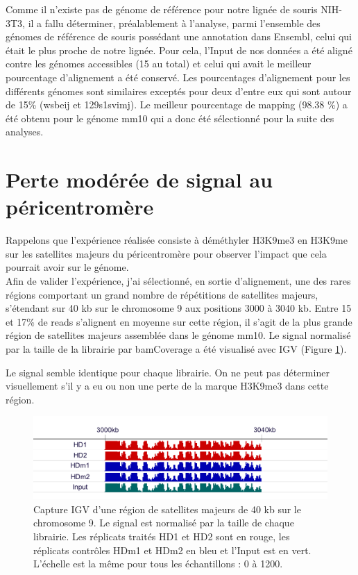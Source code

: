 \documentclass[a4paper,12pt,times]{report}
\newcommand{\scaption}[1]{\caption{\footnotesize{#1}}}
\begin{document}
    Comme il n’existe pas de  génome de référence pour notre lignée de souris NIH-3T3, il a fallu déterminer, préalablement à l'analyse, parmi l’ensemble des génomes de référence de souris possédant une annotation dans Ensembl, celui qui était le plus proche de notre lignée. 
    Pour cela, l’Input de nos données a été aligné contre les génomes accessibles (15 au total) et celui qui avait le meilleur pourcentage d’alignement a été conservé. 
    Les pourcentages d'alignement pour les différents génomes sont similaires exceptés pour deux d'entre eux qui sont autour de 15\% (wsbeij et 129s1svimj).
    \newline Le meilleur pourcentage de mapping (98.38 \%) a été obtenu pour le génome mm10 qui a donc été sélectionné pour la suite des analyses.

    \section{Perte modérée de signal au péricentromère}
    Rappelons que l'expérience réalisée consiste à déméthyler H3K9me3 en H3K9me sur les satellites majeurs du péricentromère pour observer l'impact que cela pourrait avoir sur le génome. \\
    Afin de valider l'expérience, j'ai sélectionné, en sortie d'alignement, une des rares régions comportant un grand nombre de répétitions de satellites majeurs, s'étendant sur 40 kb sur le chromosome 9 aux positions 3000 à 3040 kb.  
    Entre 15 et 17\% de reads s'alignent en moyenne sur cette région, il s'agit de la plus grande région de satellites majeurs assemblée dans le génome mm10.
    Le signal  normalisé  par la taille de la librairie par bamCoverage a été visualisé avec IGV (Figure \ref{IGV}).
    
    \bigskip
    Le signal semble identique pour chaque librairie. On ne peut pas déterminer visuellement s'il y a eu ou non une perte de la marque H3K9me3 dans cette région.       
   \bigskip
    \begin{figure}[!h]
   \centering
    \includegraphics[scale=0.4]{GSATRPKM.png}
    \scaption{ Capture IGV d'une région de satellites majeurs de 40 kb sur le chromosome 9. Le signal est normalisé par la taille de chaque librairie.   Les réplicats traités HD1 et HD2 sont en rouge, les réplicats contrôles HDm1 et HDm2 en bleu et l'Input est en vert. L'échelle est la même pour tous les échantillons :  0 à 1200.}
  \label{IGV}
  \end{figure}
\end{document}
